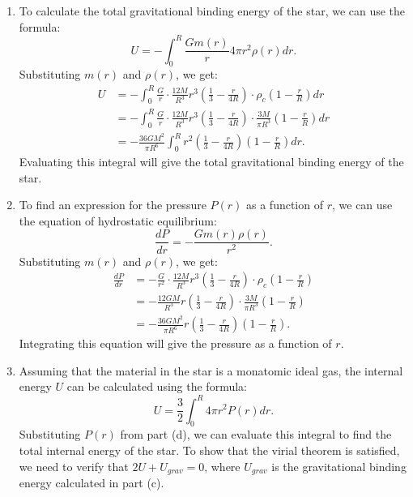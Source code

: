 \begin{enumerate}[label=(\alph*)]
\begin{equation}
    \end{equation}
    \item To calculate the total gravitational binding energy of the star, we can use the formula:
    \begin{equation}
        U = -\int_0^R \frac{G m(r)}{r} 4\pi r^2 \rho(r) dr.
    \end{equation}
    Substituting $m(r)$ and $\rho(r)$, we get:
    \begin{align*}
        U &= -\int_0^R \frac{G}{r} \cdot \frac{12M}{R^3} r^3 \left( \frac{1}{3} - \frac{r}{4R} \right) \cdot \rho_c \left(1 - \frac{r}{R}\right) dr \\
          &= -\int_0^R \frac{G}{r} \cdot \frac{12M}{R^3} r^3 \left( \frac{1}{3} - \frac{r}{4R} \right) \cdot \frac{3M}{\pi R^3} \left(1 - \frac{r}{R}\right) dr \\
          &= -\frac{36G M^2}{\pi R^6} \int_0^R r^2 \left( \frac{1}{3} - \frac{r}{4R} \right) \left(1 - \frac{r}{R}\right) dr.
    \end{align*}
    Evaluating this integral will give the total gravitational binding energy of the star.
    \item To find an expression for the pressure $P(r)$ as a function of $r$, we can use the equation of hydrostatic equilibrium:
    \begin{equation}
    \frac{dP}{dr} = -\frac{G m(r) \rho(r)}{r^2}.
    \end{equation}
    Substituting $m(r)$ and $\rho(r)$, we get:
    \begin{align*}
        \frac{dP}{dr} &= -\frac{G}{r^2} \cdot \frac{12M}{R^3} r^3 \left( \frac{1}{3} - \frac{r}{4R} \right) \cdot \rho_c \left(1 - \frac{r}{R}\right) \\
                       &= -\frac{12G M}{R^3} r \left( \frac{1}{3} - \frac{r}{4R} \right) \cdot \frac{3M}{\pi R^3} \left(1 - \frac{r}{R}\right) \\
                       &= -\frac{36G M^2}{\pi R^6} r \left( \frac{1}{3} - \frac{r}{4R} \right) \left(1 - \frac{r}{R}\right).
    \end{align*}
    Integrating this equation will give the pressure as a function of $r$.
    \item Assuming that the material in the star is a monatomic ideal gas, the internal energy $U$ can be calculated using the formula:
    \begin{equation}    
        U = \frac{3}{2} \int_0^R 4\pi r^2 P(r) dr.
    \end{equation}
    Substituting $P(r)$ from part (d), we can evaluate this integral to find the total internal energy of the star. To show that the virial theorem is satisfied, we need to verify that $2U + U_{grav} = 0$, where $U_{grav}$ is the gravitational binding energy calculated in part (c).
\end{enumerate}